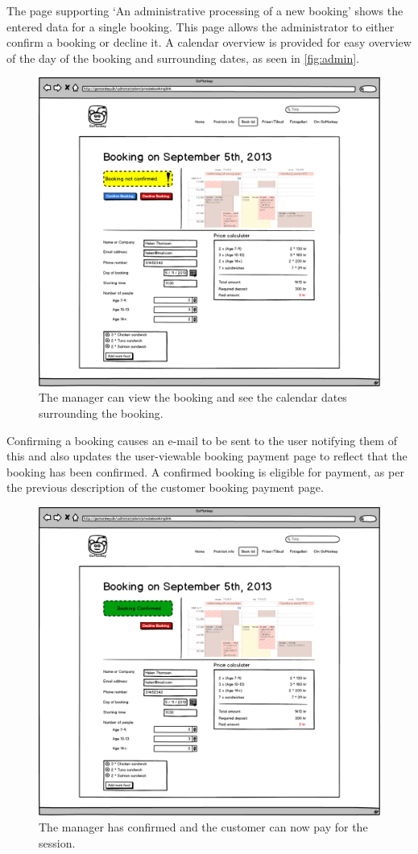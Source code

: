 \FloatBarrier
\newpage

The page supporting `An administrative processing of a new booking' shows the
entered data for a single booking. This page allows the administrator to either
confirm a booking or decline it. A calendar overview is provided for easy
overview of the day of the booking and surrounding dates, as seen in
\autoref{fig:admin}.

\begin{figure}[htbp]
    \centering
        \includegraphics[width=.6\textwidth]{figures/mockup/admin_booking.png}
	    \caption{The manager can view the booking and see the calendar dates surrounding the booking.}
        \label{fig:admin}
\end{figure}

Confirming a booking causes an e-mail to be sent to the user notifying them of
this and also updates the user-viewable booking payment page to reflect that the
booking has been confirmed. A confirmed booking is eligible for payment, as per
the previous description of the customer booking payment page.

\begin{figure}[htbp]
    \centering
        \includegraphics[width=.6\textwidth]{figures/mockup/admin_booking_confirmed.png}
	    \caption{The manager has confirmed and the customer can now pay for the session.}
        \label{fig:adminconfirmed}
\end{figure}

